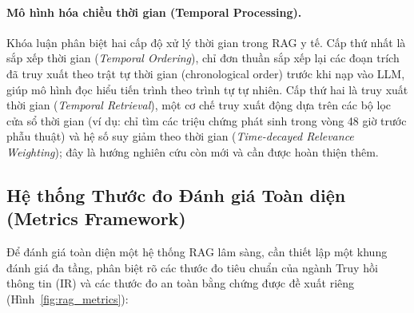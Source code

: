 \paragraph{Mô hình hóa chiều thời gian (Temporal Processing).}
Khóa luận phân biệt hai cấp độ xử lý thời gian trong RAG y tế. Cấp thứ nhất là sắp xếp thời gian (\emph{Temporal Ordering}), chỉ đơn thuần sắp xếp lại các đoạn trích đã truy xuất theo trật tự thời gian (chronological order) trước khi nạp vào LLM, giúp mô hình đọc hiểu tiến trình theo trình tự tự nhiên. Cấp thứ hai là truy xuất thời gian (\emph{Temporal Retrieval}), một cơ chế truy xuất động dựa trên các bộ lọc cửa sổ thời gian (ví dụ: chỉ tìm các triệu chứng phát sinh trong vòng 48 giờ trước phẫu thuật) và hệ số suy giảm theo thời gian (\emph{Time-decayed Relevance Weighting}); đây là hướng nghiên cứu còn mới và cần được hoàn thiện thêm.

\subsection{Hệ thống Thước đo Đánh giá Toàn diện (Metrics Framework)}

Để đánh giá toàn diện một hệ thống RAG lâm sàng, cần thiết lập một khung đánh giá đa tầng, phân biệt rõ các thước đo tiêu chuẩn của ngành Truy hồi thông tin (IR) và các thước đo an toàn bằng chứng được đề xuất riêng (Hình~\ref{fig:rag_metrics}):

